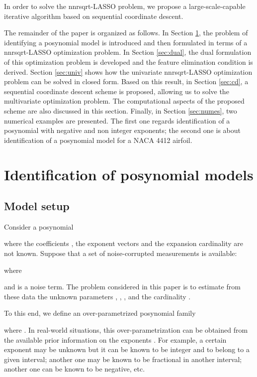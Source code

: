 \documentclass[11pt]{article}
\begin{document}
In order to solve the nnrsqrt-LASSO problem, we propose a large-scale-capable
iterative algorithm based on sequential coordinate descent.


The remainder of the paper is organized as follows. In Section \ref{sec:id_pos}, the problem
of identifying a posynomial model is introduced and then formulated
in terms of a nnrsqrt-LASSO optimization problem. In Section \ref{sec:dual},
the dual formulation of this optimization problem is developed and
the feature elimination condition is derived. Section \ref{sec:univ}
shows how the univariate nnrsqrt-LASSO optimization problem can be
solved in closed form. Based on this result, in Section \ref{sec:cd},
a sequential coordinate descent scheme is proposed, allowing us
to solve the multivariate optimization problem. The computational
aspects of the proposed scheme are also discussed in this section.
Finally, in Section \ref{sec:numes}, two numerical examples are presented.
The first one regards identification of a posynomial with negative
and non integer exponents; the second one is about identification
of a posynomial model for a NACA 4412 airfoil.



\section{Identification of posynomial models}
\label{sec:id_pos}

\subsection{Model setup}
\label{pp_id}
Consider a posynomial

where the coefficients , the exponent vectors 
and the expansion cardinality  are not known. Suppose that
a set of noise-corrupted measurements is available:

where 

and  is a noise term. The problem considered in this
paper is to estimate from these data the unknown parameters ,
, , and the cardinality .

To this end, we define an over-parametrized posynomial family

where . In real-world situations, this over-parametrization
can be obtained from the available prior information on the exponents
. For example, a certain exponent may be unknown
but it can be known to be  integer and to belong to a given interval; another
one may be known to be fractional in another interval; another one can be known to be negative,
etc.
\end{document}
